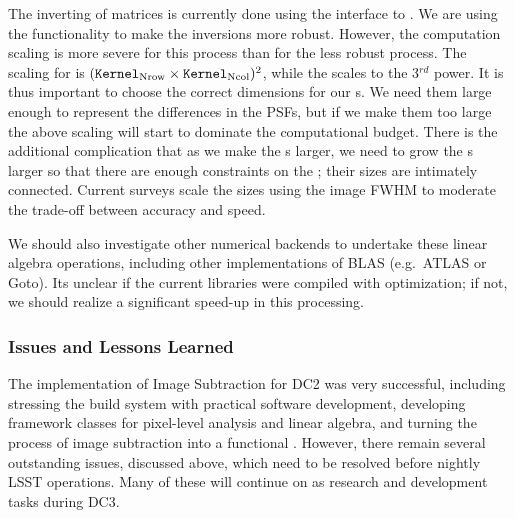 
The inverting of matrices is currently done using the 
interface to .  We are using the 
functionality to make the inversions more robust.  However, the
computation scaling is more severe for this process than for the less
robust  process.  The scaling for  is
$(\texttt{Kernel}_{\rm Nrow} \times \texttt{Kernel}_{\rm Ncol})^2$, while
the  scales to the 3$^{rd}$ power.  It is thus
important to choose the correct dimensions for our
s.  We need them large enough to represent the 
differences in the PSFs, but if we make them too large the above
scaling will start to dominate the computational budget.  There is the
additional complication that as we make the s larger, we
need to grow the s larger so that there are enough
constraints on the ; their sizes are intimately
connected.  Current surveys scale the sizes using the image FWHM to
moderate the trade-off between accuracy and speed.

We should also investigate other numerical backends to undertake these
linear algebra operations, including other implementations of BLAS
(e.g.~ATLAS or Goto).  Its unclear if the current 
libraries were compiled with optimization; if not, we should realize a
significant speed-up in this processing.

\subsubsection{Issues and Lessons Learned}

The implementation of Image Subtraction for DC2 was very successful,
including stressing the build system with practical software
development, developing framework classes for pixel-level analysis
and linear algebra, and turning the process of image subtraction into
a functional .  However, there remain several
outstanding issues, discussed above, which need to be resolved before
nightly LSST operations.  Many of these will continue on as research
and development tasks during DC3.

